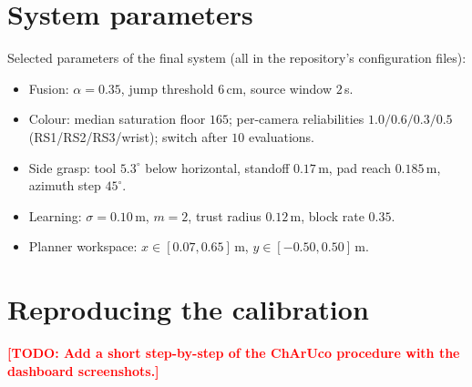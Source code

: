\documentclass[12pt]{article}
\newcommand{\todo}[1]{\textcolor{red}{\textbf{[TODO: #1]}}}
\begin{document}
\begin{appendices}

\section{System parameters}
Selected parameters of the final system (all in the repository's configuration files):
\begin{itemize}
  \item Fusion: $\alpha=0.35$, jump threshold $6$\,cm, source window $2$\,s.
  \item Colour: median saturation floor $165$; per-camera reliabilities $1.0/0.6/0.3/0.5$ (RS1/RS2/RS3/wrist); switch after $10$ evaluations.
  \item Side grasp: tool $5.3^\circ$ below horizontal, standoff $0.17$\,m, pad reach $0.185$\,m, azimuth step $45^\circ$.
  \item Learning: $\sigma=0.10$\,m, $m=2$, trust radius $0.12$\,m, block rate $0.35$.
  \item Planner workspace: $x\in[0.07,0.65]$\,m, $y\in[-0.50,0.50]$\,m.
\end{itemize}

\section{Reproducing the calibration}
\todo{Add a short step-by-step of the ChArUco procedure with the dashboard screenshots.}

\end{appendices}
\end{document}
